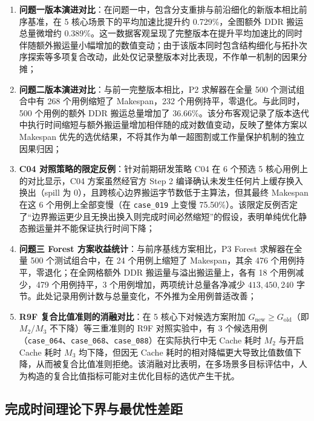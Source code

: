 \documentclass[anonymous,notoc]{gmcm2026}
\providecommand{\tightlist}{\setlength{\itemsep}{0pt}\setlength{\parskip}{0pt}}
\begin{document}
\begin{enumerate}
\def\labelenumi{\arabic{enumi}.}
\tightlist
\item
  \textbf{问题一版本演进对比}：在问题一中，包含分支重排与前沿细化的新版本相比前序基准，在 5 核心场景下的平均加速比提升约 0.729\%，全图额外 DDR 搬运总量微增约 0.389\%。这一数据客观呈现了完整版本在提升平均加速比的同时伴随额外搬运量小幅增加的数值变动；由于该版本同时包含结构细化与拓扑次序探索等多项复合改动，此处仅记录整版本对比表现，不作单一机制的因果分摊；
\item
  \textbf{问题二版本演进对比}：与前一完整版本相比，P2 求解器在全量 500 个测试组合中有 268 个用例缩短了 Makespan，232 个用例持平，零退化。与此同时，500 个用例的额外 DDR 搬运总量增加了 36.66\%。该分布客观记录了版本迭代中执行时间缩短与额外搬运量增加相伴随的成对数值变动，反映了整体方案以 Makespan 优先的选优结果，不将其作为单一超图割或工作量保护机制的独立因果归因；
\item
  \textbf{C04 对照策略的限定反例}：针对前期研发策略 C04 在 6 个预选 5 核心用例上的对比显示，C04 方案虽然经官方 Step 2 编译确认未发生任何片上缓存换入换出（spill 为 0），且跨核心边界搬运字节数低于主算法，但其最终 Makespan 在这 6 个用例上全部变慢（在 \texttt{case\_019} 上变慢 75.50\%）。该限定反例否定了``边界搬运更少且无换出换入则完成时间必然缩短''的假设，表明单纯优化静态搬运量并不能保证执行时间下降；
\item
  \textbf{问题三 Forest 方案收益统计}：与前序基线方案相比，P3 Forest 求解器在全量 500 个测试组合中，在 24 个用例上缩短了 Makespan，其余 476 个用例持平，零退化；在全网格额外 DDR 搬运量与溢出搬运量上，各有 18 个用例减少，479 个用例持平，3 个用例增加，两项统计总量各净减少 \(413{,}450{,}240\) 字节。此处记录用例计数与总量变化，不外推为全用例普适改善；
\item
  \textbf{R9F 复合比值准则的消融对比}：在 5 核心下对候选方案附加 \(G_{\mathrm{new}} \ge G_{\mathrm{old}}\)（即 \(M_2/M_3\) 不下降）等三重准则的 R9F 对照实验中，有 3 个候选用例（\texttt{case\_064}、\texttt{case\_068}、\texttt{case\_088}）在实际执行中无 Cache 耗时 \(M_2\) 与开启 Cache 耗时 \(M_3\) 均下降，但因无 Cache 耗时的相对降幅更大导致比值数值下降，从而被复合比值准则拒绝。该消融对比表明，在多场景多目标评估中，人为构造的复合比值指标可能对主优化目标的选优产生干扰。
\end{enumerate}

\subsection{完成时间理论下界与最优性差距}
\end{document}
